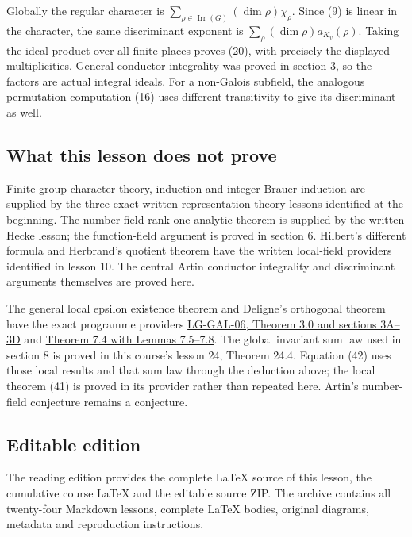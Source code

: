 \documentclass[11pt,a4paper]{article}
\begin{document}
Globally the regular character is
\(\sum_{\rho\in\operatorname{Irr}(G)}(\dim\rho)\chi_\rho\). Since (9) is
linear in the character, the same discriminant exponent is
\(\sum_\rho(\dim\rho)a_{K_v}(\rho)\). Taking the ideal product over all
finite places proves (20), with precisely the displayed multiplicities.
General conductor integrality was proved in section 3, so the factors
are actual integral ideals. For a non-Galois subfield, the analogous
permutation computation (16) uses different transitivity to give its
discriminant as well.

\subsection{What this lesson does not
prove}\label{what-this-lesson-does-not-prove}

Finite-group character theory, induction and integer Brauer induction
are supplied by the three exact written representation-theory lessons
identified at the beginning. The number-field rank-one analytic theorem
is supplied by the written Hecke lesson; the function-field argument is
proved in section 6. Hilbert's different formula and Herbrand's quotient
theorem have the written local-field providers identified in lesson 10.
The central Artin conductor integrality and discriminant arguments
themselves are proved here.

The general local epsilon existence theorem and Deligne’s orthogonal theorem have the exact programme providers \href{https://kokunoyumeto.github.io/open-math-courses/courses/LG-GAL/local-l-factors-and-epsilon-factors.html\#3-existence-and-uniqueness-of-local-constants}{LG-GAL-06, Theorem 3.0 and sections 3A–3D} and \href{https://kokunoyumeto.github.io/open-math-courses/courses/LG-GAL/local-l-factors-and-epsilon-factors.html\#7-sharp-twisting-and-orthogonal-root-numbers}{Theorem 7.4 with Lemmas 7.5–7.8}. The global invariant sum law used in section 8 is proved in this course’s lesson 24, Theorem 24.4. Equation (42) uses those local results and that sum law through the deduction above; the local theorem (41) is proved in its provider rather than repeated here. Artin’s number-field conjecture remains a conjecture.

\subsection{Editable edition}\label{editable-edition}

The reading edition provides the complete LaTeX source of this lesson,
the cumulative course LaTeX and the editable source ZIP. The archive
contains all twenty-four Markdown lessons, complete LaTeX bodies,
original diagrams, metadata and reproduction instructions.
\end{document}
